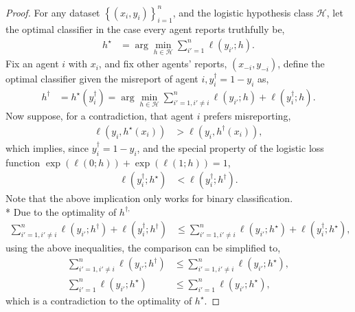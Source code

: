 \documentclass{article}
\begin{document}
\begin{proof} \label{proof:binpf} 
For any dataset $\left\{\left(x_{i}, y_{i}\right)\right\}_{i=1}^{n}$, and the logistic hypothesis class $\mathcal{H}$, let the optimal classifier in the case every agent reports truthfully be,
\begin{align*}
h^\star  &= \arg\displaystyle\min_{h \in \mathcal{H}} \displaystyle\sum_{i'=1}^{n} \ell\left(y_{i'}; h\right).
\end{align*}
Fix an agent $i $ with $x_{i}$, and fix other agents' reports, $\left(x_{-i}, y_{-i}\right)$, define the optimal classifier given the misreport of agent $i , y^{\dagger}_{i} = 1 - y_{i}$ as,
\begin{align*}
h^{\dagger} &= h^\star \left(y^{\dagger}_{i}\right) = \arg\displaystyle\min_{h \in \mathcal{H}} \displaystyle\sum_{i'=1, i' \neq  i}^{n} \ell\left(y_{i'} ; h\right) + \ell\left(y^{\dagger}_{i} ; h\right).
\end{align*}
Now suppose, for a contradiction, that agent $i $ prefers misreporting,
\begin{align*}
\ell\left(y_{i}, h^\star \left(x_{i}\right)\right) &> \ell\left(y_{i},  h^{\dagger}\left(x_{i}\right)\right),
\end{align*}
which implies, since $y^{\dagger}_{i} = 1 - y_{i}$, and the special property of the logistic loss function $\exp\left(\ell\left(0 ; h\right)\right) + \exp\left(\ell\left(1 ; h\right)\right) = 1$,
\begin{align*}
\ell\left(y^{\dagger}_{i} ; h^\star \right) &< \ell\left(y^{\dagger}_{i} ; h^{\dagger}\right).
\end{align*}
Note that the above implication only works for binary classification.
\\* Due to the optimality of $h^{\dagger,}$
\begin{align*}
\displaystyle\sum_{i'=1, i' \neq  i}^{n} \ell\left(y_{i'} ; h^{\dagger}\right) + \ell\left(y^{\dagger}_{i} ; h^{\dagger}\right) &\leq  \displaystyle\sum_{i'=1, i' \neq  i}^{n} \ell\left(y_{i'} ; h^\star \right) + \ell\left(y^{\dagger}_{i} ; h^\star \right),
\end{align*}
using the above inequalities, the comparison can be simplified to,
\begin{align*}
\displaystyle\sum_{i'=1, i' \neq  i}^{n} \ell\left(y_{i'} ; h^{\dagger}\right) &\leq  \displaystyle\sum_{i'=1, i' \neq  i}^{n} \ell\left(y_{i'} ; h^\star \right),
\\ \displaystyle\sum_{i'=1}^{n} \ell\left(y_{i'} ; h^\star \right) &\leq  \displaystyle\sum_{i'=1}^{n} \ell\left(y_{i'} ; h^\star \right),
\end{align*}
which is a contradiction to the optimality of $h^\star $.
\newline \newline\end{proof}
\end{document}
